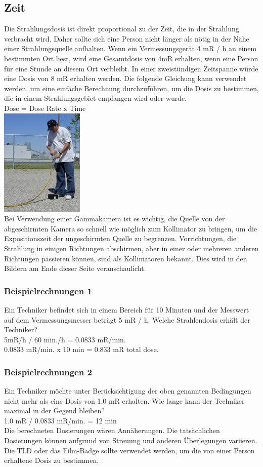 \subsection{Zeit}
Die Strahlungsdosis ist direkt proportional zu der Zeit, die in der Strahlung verbracht wird. Daher sollte sich eine Person nicht länger als nötig in der Nähe einer Strahlungsquelle aufhalten. Wenn ein Vermessungsgerät 4 mR / h an einem bestimmten Ort liest, wird eine Gesamtdosis von 4mR erhalten, wenn eine Person für eine Stunde an diesem Ort verbleibt. In einer zweistündigen Zeitspanne würde eine Dosis von 8 mR erhalten werden. Die folgende Gleichung kann verwendet werden, um eine einfache Berechnung durchzuführen, um die Dosis zu bestimmen, die in einem Strahlungsgebiet empfangen wird oder wurde.\\
Dose = Dose Rate x Time \\
\includegraphics[scale=0.7]{img/timeDist.jpg}\\
Bei Verwendung einer Gammakamera ist es wichtig, die Quelle von der abgeschirmten Kamera so schnell wie möglich zum Kollimator zu bringen, um die Expositionszeit der ungeschirmten Quelle zu begrenzen. Vorrichtungen, die Strahlung in einigen Richtungen abschirmen, aber in einer oder mehreren anderen Richtungen passieren können, sind als Kollimatoren bekannt. Dies wird in den Bildern am Ende dieser Seite veranschaulicht.
\subsubsection{Beispielrechnungen 1}
Ein Techniker befindet sich in einem Bereich für 10 Minuten und der Messwert auf dem Vermessungsmesser beträgt 5 mR / h. Welche Strahlendosis erhält der Techniker?\\
5mR/h / 60 min./h = 0.0833 mR/min.\\
0.0833 mR/min. x 10 min = 0.833 mR  total dose.\\

\subsubsection{Beispielrechnungen 2}
Ein Techniker möchte unter Berücksichtigung der oben genannten Bedingungen nicht mehr als eine Dosis von 1,0 mR erhalten. Wie lange kann der Techniker maximal in der Gegend bleiben?\\
1.0 mR / 0.0833 mR/min. = 12 min \\
Die berechneten Dosierungen wären Annäherungen. Die tatsächlichen Dosierungen können aufgrund von Streuung und anderen Überlegungen variieren. Die TLD oder das Film-Badge sollte verwendet werden, um die von einer Person erhaltene Dosis zu bestimmen.
